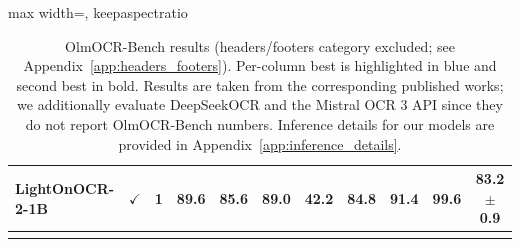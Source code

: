 \documentclass{article}
\newcommand{\bestA}[1]{\cellcolor{blue!12}\textbf{#1}}  %
\begin{document}
\begin{table}[t]
\begin{adjustbox}{max width=\linewidth, keepaspectratio}
\begin{tabular}{lcccccccccc}
\textbf{LightOnOCR-2-1B} & $\checkmark$  & 1 & \bestA{89.6} & \bestA{85.6} & \bestA{89.0} & 42.2 & 84.8 & 91.4 & 99.6 & \bestA{83.2 $\pm$ 0.9} \\


\bottomrule
\\
\end{tabular}
\end{adjustbox}
\caption{
OlmOCR-Bench results (headers/footers category excluded; see Appendix~\ref{app:headers_footers}).
Per-column best is highlighted in blue and second best in bold. Results are taken from the corresponding published works; we additionally evaluate DeepSeekOCR and the Mistral OCR 3 API since they do not report OlmOCR-Bench numbers.
Inference details for our models are provided in Appendix~\ref{app:inference_details}.
}
\label{tab:olmocr_bench_main}
\end{table}





\end{document}
